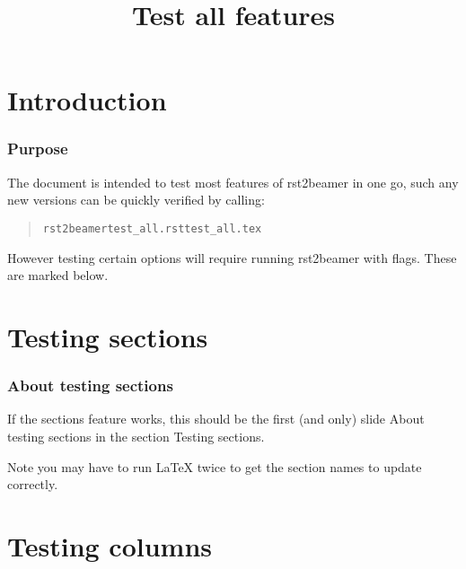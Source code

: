 \documentclass[t]{beamer}
\begin{document}
\title[Test all features]{Test all features%
  \label{test-all-features}}
\author[]{}
\date{}
\maketitle


\section{Introduction%
  \label{introduction}%
}

\begin{frame}[fragile]
\frametitle{Purpose}


The document is intended to test most features of rst2beamer in one go, such
any new versions can be quickly verified by calling:

\begin{quote}
\begin{alltt}
rst2beamer test_all.rst test_all.tex
\end{alltt}
\end{quote}

However testing certain options will require running rst2beamer with flags.
These are marked below.

\end{frame}


\section{Testing sections%
  \label{testing-sections}%
}

\begin{frame}[fragile]
\frametitle{About testing sections}


If the sections feature works, this should be the first (and only) slide
\textquotedbl{}About testing sections\textquotedbl{} in the section \textquotedbl{}Testing sections\textquotedbl{}.

Note you may have to run LaTeX twice to get the section names to update
correctly.

\end{frame}


\section{Testing columns%
  \label{testing-columns}%
}
\end{document}
